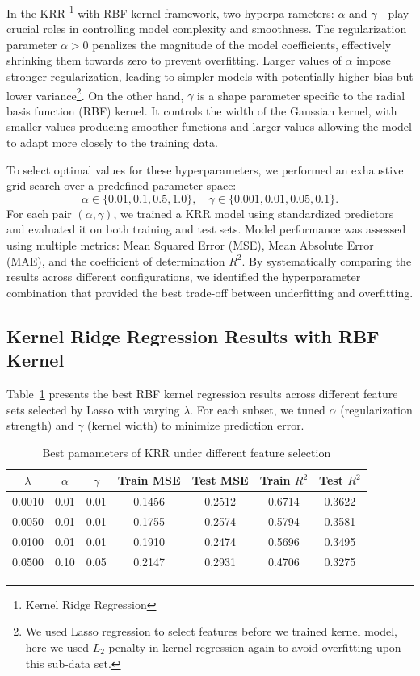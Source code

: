 \documentclass[12pt]{article}
\begin{document}
In the KRR
\footnote{Kernel Ridge Regression} 
with RBF kernel framework, two hyperpa-rameters: 
\(\alpha\) and 
\(\gamma\)—play crucial roles in controlling model complexity and smoothness. 
The regularization parameter \(\alpha > 0\) penalizes the magnitude of the model
coefficients, effectively shrinking them towards zero to prevent overfitting. 
Larger values of \(\alpha\) impose stronger regularization, leading to simpler
models with potentially higher bias but lower variance\footnote{We used Lasso regression to select features before we trained kernel model, 
here we used \(L_2\) penalty in kernel regression again to avoid overfitting upon this sub-data set.}.
On the other hand, \(\gamma\)
is a shape parameter specific to the radial basis function (RBF) kernel. It controls
the width of the Gaussian kernel, with smaller values producing smoother functions
and larger values allowing the model to adapt more closely to the training data.

To select optimal values for these hyperparameters, we performed an exhaustive grid search over a predefined parameter space:
\[
\alpha \in \{0.01, 0.1, 0.5, 1.0\}, \quad \gamma \in \{0.001, 0.01, 0.05, 0.1\}.
\]
For each pair \((\alpha, \gamma)\), we trained a KRR model using standardized predictors
and evaluated it on both training and test sets. Model performance was assessed using 
multiple metrics: Mean Squared Error (MSE), Mean Absolute Error (MAE), and the coefficient 
of determination \(R^2\). By systematically comparing the results across different configurations, 
we identified the hyperparameter combination that provided the best trade-off between underfitting and overfitting.

\subsection{Kernel Ridge Regression Results with RBF Kernel}

Table~\ref{tab:best_kernel_models} presents the best RBF kernel regression
results across different feature sets selected by Lasso with varying $\lambda$. 
For each subset, we tuned $\alpha$ (regularization strength) and $\gamma$ (kernel width) to minimize prediction error.

\begin{table}[!h]
    \centering
    \caption{Best pamameters of KRR under different feature selection}
    \label{tab:best_kernel_models}
    \begin{tabular}{ccccccc}
    \toprule
    \textbf{$\lambda$} & \textbf{$\alpha$} & \textbf{$\gamma$} & \textbf{Train MSE} & \textbf{Test MSE} & \textbf{Train $R^2$} & \textbf{Test $R^2$} \\
    \midrule
    0.0010 & 0.01 & 0.01 & 0.1456 & 0.2512 & 0.6714 & 0.3622 \\
    0.0050 & 0.01 & 0.01 & 0.1755 & 0.2574 & 0.5794 & 0.3581 \\
    0.0100 & 0.01 & 0.01 & 0.1910 & 0.2474 & 0.5696 & 0.3495 \\
    0.0500 & 0.10 & 0.05 & 0.2147 & 0.2931 & 0.4706 & 0.3275 \\
    \bottomrule
    \end{tabular}
\end{table}
\end{document}
